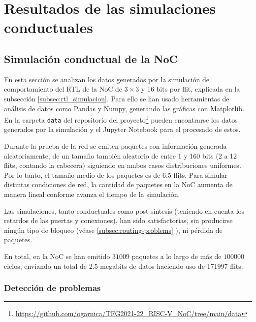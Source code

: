 \chapter{Resultados de las simulaciones conductuales}

\section{Simulación conductual de la NoC}
\label{sec:resNoC}

En esta sección se analizan los datos generados por la simulación de comportamiento del RTL de la NoC de $3\times3$ y 16 bits por flit, explicada en la subsección \ref{subsec:rtl_simulacion}. Para ello se han usado herramientas de análisis de datos como Pandas y Numpy, generando las gráficas con Matplotlib. En la carpeta \texttt{data} del repositorio del proyecto\footnote{\url{https://github.com/ogarnica/TFG2021-22_RISC-V_NoC/tree/main/data}} pueden encontrarse los datos generados por la simulación y el Jupyter Notebook para el procesado de estos.

Durante la prueba de la red se emiten paquetes con información generada aleatoriamente, de un tamaño también aleatorio de entre 1 y 160 bits (2 a 12 flits, contando la cabecera) siguiendo en ambos casos distribuciones uniformes. Por lo tanto, el tamaño medio de los paquetes es de $6.5$ flits. Para simular distintas condiciones de red, la cantidad de paquetes en la NoC aumenta de manera lineal conforme avanza el tiempo de la simulación.

Las simulaciones, tanto conductuales como post-síntesis (teniendo en cuenta los retardos de las puertas y conexiones), han sido satisfactorias, sin producirse ningún tipo de bloqueo (véase \ref{subsec:routing-problems} ), ni pérdida de paquetes.

En total, en la NoC se han emitido $31009$ paquetes a lo largo de más de $100000$ ciclos, enviando un total de 2.5 megabits de datos haciendo uso de $171997$ flits.

\subsection{Detección de problemas}

